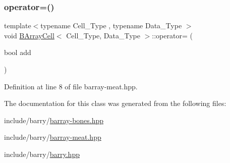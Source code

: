 \subsubsection{\texorpdfstring{operator=()}{operator=()}}
{\footnotesize\ttfamily template$<$typename Cell\+\_\+\+Type , typename Data\+\_\+\+Type $>$ \\
void \hyperlink{class_b_array_cell}{B\+Array\+Cell}$<$ Cell\+\_\+\+Type, Data\+\_\+\+Type $>$\+::operator= (\begin{DoxyParamCaption}\item[{bool}]{add }\end{DoxyParamCaption})\hspace{0.3cm}{\ttfamily [inline]}}



Definition at line 8 of file barray-\/meat.\+hpp.



The documentation for this class was generated from the following files\+:\begin{DoxyCompactItemize}
\item 
include/barry/\hyperlink{barray-bones_8hpp}{barray-\/bones.\+hpp}\item 
include/barry/\hyperlink{barray-meat_8hpp}{barray-\/meat.\+hpp}\item 
include/barry/\hyperlink{barry_8hpp}{barry.\+hpp}\end{DoxyCompactItemize}
